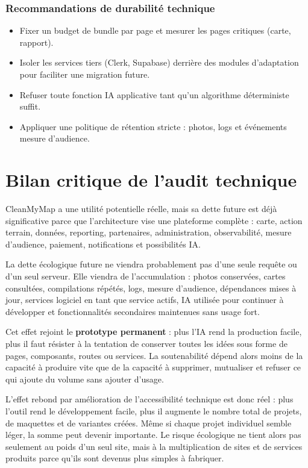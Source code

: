 \documentclass[
  10pt,
  a4paper,
  DIV=11,
  numbers=noendperiod,
  oneside]{scrreprt}
\providecommand{\tightlist}{%
  \setlength{\itemsep}{0pt}\setlength{\parskip}{0pt}}
\let\oldtextbf\textbf
\renewcommand{\textbf}[1]{\oldtextbf{\textcolor{cmmnavy}{#1}}}
\begin{document}
\subsubsection{Recommandations de durabilité
technique}\label{recommandations-de-durabilituxe9-technique}

\begin{itemize}
\tightlist
\item
  Fixer un budget de bundle par page et mesurer les pages critiques
  (carte, rapport).
\item
  Isoler les services tiers (Clerk, Supabase) derrière des modules
  d'adaptation pour faciliter une migration future.
\item
  Refuser toute fonction IA applicative tant qu'un algorithme
  déterministe suffit.
\item
  Appliquer une politique de rétention stricte : photos, logs et
  événements mesure d'audience.
\end{itemize}

\section{Bilan critique de l'audit
technique}\label{bilan-critique-de-laudit-technique}

CleanMyMap a une utilité potentielle réelle, mais sa dette future est
déjà significative parce que l'architecture vise une plateforme complète
: carte, action terrain, données, reporting, partenaires,
administration, observabilité, mesure d'audience, paiement,
notifications et possibilités IA.

La dette écologique future ne viendra probablement pas d'une seule
requête ou d'un seul serveur. Elle viendra de l'accumulation : photos
conservées, cartes consultées, compilations répétés, logs, mesure
d'audience, dépendances mises à jour, services logiciel en tant que
service actifs, IA utilisée pour continuer à développer et
fonctionnalités secondaires maintenues sans usage fort.

Cet effet rejoint le \textbf{prototype permanent} : plus l'IA rend la
production facile, plus il faut résister à la tentation de conserver
toutes les idées sous forme de pages, composants, routes ou services. La
soutenabilité dépend alors moins de la capacité à produire vite que de
la capacité à supprimer, mutualiser et refuser ce qui ajoute du volume
sans ajouter d'usage.

L'effet rebond par amélioration de l'accessibilité technique est donc
réel : plus l'outil rend le développement facile, plus il augmente le
nombre total de projets, de maquettes et de variantes créées. Même si
chaque projet individuel semble léger, la somme peut devenir importante.
Le risque écologique ne tient alors pas seulement au poids d'un seul
site, mais à la multiplication de sites et de services produits parce
qu'ils sont devenus plus simples à fabriquer.
\end{document}
